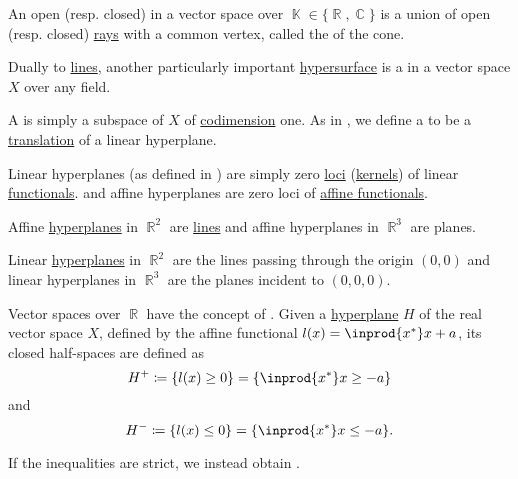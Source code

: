 \begin{definition}\label{def:geometric_cone}
  An open (resp. closed)  in a vector space over \( \BbbK \in \{ \BbbR, \BbbC \} \) is a union of open (resp. closed) \hyperref[def:geometric_ray]{rays} with a common vertex, called the  of the cone.
\end{definition}

\begin{definition}\label{def:hyperplane}
  Dually to \hyperref[def:geometric_line]{lines}, another particularly important \hyperref[def:hypersurface]{hypersurface} is a  in a vector space \( X \) over any field.

  \begin{thmenum}
     A  is simply a subspace of \( X \) of \hyperref[thm:vector_space_dimension]{codimension} one. As in , we define a  to be a \hyperref[def:rigid_motion/translation]{translation} of a linear hyperplane.

     Linear hyperplanes (as defined in ) are simply zero \hyperref[def:zero_locus]{loci} (\hyperref[def:ring/kernel]{kernels}) of linear \hyperref[def:semimodule/homomorphism]{functionals}. and affine hyperplanes are zero loci of \hyperref[def:affine_operator]{affine functionals}.
  \end{thmenum}
\end{definition}

\begin{example}\label{ex:hyperplanes}
  Affine \hyperref[def:hyperplane]{hyperplanes} in \( \BbbR^2 \) are \hyperref[def:geometric_line]{lines} and affine hyperplanes in \( \BbbR^3 \) are planes.

  Linear \hyperref[def:hyperplane]{hyperplanes} in \( \BbbR^2 \) are the lines passing through the origin \( (0, 0) \) and linear hyperplanes in \( \BbbR^3 \) are the planes incident to \( (0, 0, 0) \).
\end{example}

\begin{definition}\label{def:half_space}
  Vector spaces over \( \BbbR \) have the concept of . Given a \hyperref[def:hyperplane]{hyperplane} \( H \) of the real vector space \( X \), defined by the affine functional \( l(x) = \inprod {x^*} x + a \), its closed half-spaces are defined as
  \begin{equation*}
    H^+ \coloneqq \{ l(x) \geq 0 \} = \{ \inprod {x^*} x \geq -a \}
  \end{equation*}
  and
  \begin{equation*}
    H^- \coloneqq \{ l(x) \leq 0 \} = \{ \inprod {x^*} x \leq -a \}.
  \end{equation*}

  If the inequalities are strict, we instead obtain .
\end{definition}


